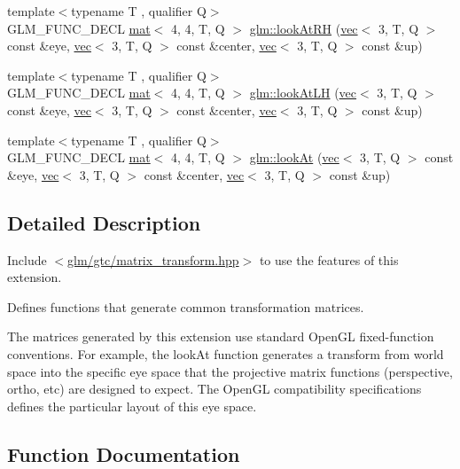 \begin{DoxyCompactItemize}
\item 
{\footnotesize template$<$typename T , qualifier Q$>$ }\\G\+L\+M\+\_\+\+F\+U\+N\+C\+\_\+\+D\+E\+CL \hyperlink{structglm_1_1mat}{mat}$<$ 4, 4, T, Q $>$ \hyperlink{group__gtc__matrix__transform_gacfa12c8889c754846bc20c65d9b5c701}{glm\+::look\+At\+RH} (\hyperlink{structglm_1_1vec}{vec}$<$ 3, T, Q $>$ const \&eye, \hyperlink{structglm_1_1vec}{vec}$<$ 3, T, Q $>$ const \&center, \hyperlink{structglm_1_1vec}{vec}$<$ 3, T, Q $>$ const \&up)
\item 
{\footnotesize template$<$typename T , qualifier Q$>$ }\\G\+L\+M\+\_\+\+F\+U\+N\+C\+\_\+\+D\+E\+CL \hyperlink{structglm_1_1mat}{mat}$<$ 4, 4, T, Q $>$ \hyperlink{group__gtc__matrix__transform_gab2c09e25b0a16d3a9d89cc85bbae41b0}{glm\+::look\+At\+LH} (\hyperlink{structglm_1_1vec}{vec}$<$ 3, T, Q $>$ const \&eye, \hyperlink{structglm_1_1vec}{vec}$<$ 3, T, Q $>$ const \&center, \hyperlink{structglm_1_1vec}{vec}$<$ 3, T, Q $>$ const \&up)
\item 
{\footnotesize template$<$typename T , qualifier Q$>$ }\\G\+L\+M\+\_\+\+F\+U\+N\+C\+\_\+\+D\+E\+CL \hyperlink{structglm_1_1mat}{mat}$<$ 4, 4, T, Q $>$ \hyperlink{group__gtc__matrix__transform_gaa64aa951a0e99136bba9008d2b59c78e}{glm\+::look\+At} (\hyperlink{structglm_1_1vec}{vec}$<$ 3, T, Q $>$ const \&eye, \hyperlink{structglm_1_1vec}{vec}$<$ 3, T, Q $>$ const \&center, \hyperlink{structglm_1_1vec}{vec}$<$ 3, T, Q $>$ const \&up)
\end{DoxyCompactItemize}


\subsection{Detailed Description}
Include $<$\hyperlink{matrix__transform_8hpp}{glm/gtc/matrix\+\_\+transform.\+hpp}$>$ to use the features of this extension.

Defines functions that generate common transformation matrices.

The matrices generated by this extension use standard Open\+GL fixed-\/function conventions. For example, the look\+At function generates a transform from world space into the specific eye space that the projective matrix functions (perspective, ortho, etc) are designed to expect. The Open\+GL compatibility specifications defines the particular layout of this eye space. 

\subsection{Function Documentation}
\mbox{\label{group__gtc__matrix__transform_ga0bcd4542e0affc63a0b8c08fcb839ea9}} 
